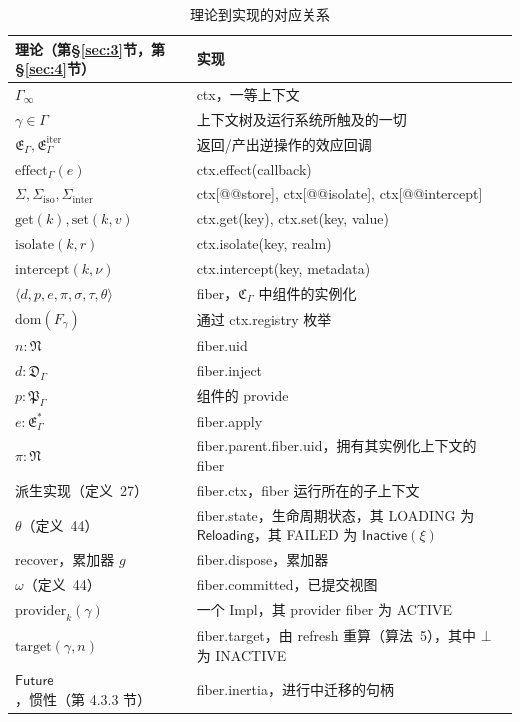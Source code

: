 \begin{table}[htbp]
\centering
\caption{理论到实现的对应关系}
\label{tab:2}
\begin{tabular}{ll}
\hline
理论（第\S\ref{sec:3}节，第\S\ref{sec:4}节） & 实现 \\
\hline
$\Gamma_\infty$ & ctx，一等上下文 \\
$\gamma \in \Gamma$ & 上下文树及运行系统所触及的一切 \\
$\mathfrak{E}_\Gamma, \mathfrak{E}_\Gamma^{\mathrm{iter}}$ & 返回/产出逆操作的效应回调 \\
$\mathrm{effect}_\Gamma(e)$ & ctx.effect(callback) \\
$\Sigma, \Sigma_{\mathrm{iso}}, \Sigma_{\mathrm{inter}}$ & ctx[@@store], ctx[@@isolate], ctx[@@intercept] \\
$\mathrm{get}(k), \mathrm{set}(k, v)$ & ctx.get(key), ctx.set(key, value) \\
$\mathrm{isolate}(k, r)$ & ctx.isolate(key, realm) \\
$\mathrm{intercept}(k, \nu)$ & ctx.intercept(key, metadata) \\
$\langle d, p, e, \pi, \sigma, \tau, \theta \rangle$ & fiber，$\mathfrak{C}_\Gamma$ 中组件的实例化 \\
$\mathrm{dom}(F_\gamma)$ & 通过 ctx.registry 枚举 \\
$n : \mathfrak{N}$ & fiber.uid \\
$d : \mathfrak{D}_\Gamma$ & fiber.inject \\
$p : \mathfrak{P}_\Gamma$ & 组件的 provide \\
$e : \mathfrak{E}_\Gamma^*$ & fiber.apply \\
$\pi : \mathfrak{N}$ & fiber.parent.fiber.uid，拥有其实例化上下文的 fiber \\
派生实现（定义~27） & fiber.ctx，fiber 运行所在的子上下文 \\
$\theta$（定义~44） & fiber.state，生命周期状态，其 LOADING 为 $\mathsf{Reloading}$，其 FAILED 为 $\mathsf{Inactive}(\xi)$ \\
recover，累加器 $g$ & fiber.dispose，累加器 \\
$\omega$（定义~44） & fiber.committed，已提交视图 \\
$\mathrm{provider}_k(\gamma)$ & 一个 Impl，其 provider fiber 为 ACTIVE \\
$\mathrm{target}(\gamma, n)$ & fiber.target，由 refresh 重算（算法~5），其中 $\bot$ 为 INACTIVE \\
$\mathsf{Future}$，惯性（第 4.3.3 节） & fiber.inertia，进行中迁移的句柄 \\

\end{tabular}
\end{table}
